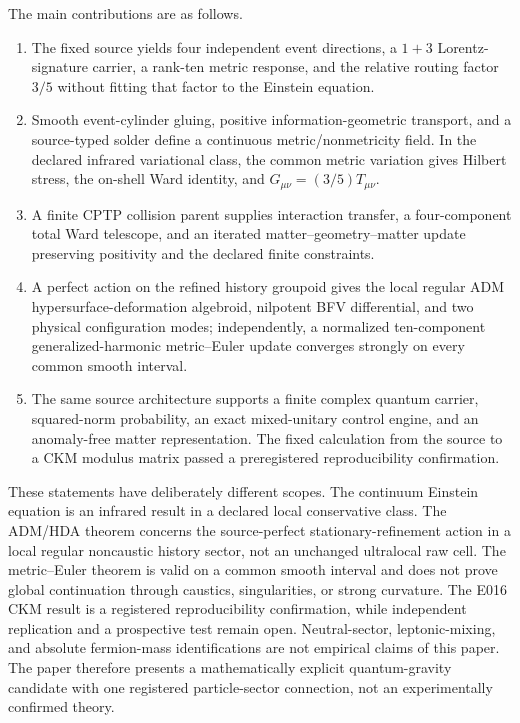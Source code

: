 \documentclass[11pt]{article}
\theoremstyle{definition}
\theoremstyle{remark}
\begin{document}
The main contributions are as follows.
\begin{enumerate}[label=(\roman*)]
  \item The fixed source yields four independent event directions, a
  $1+3$ Lorentz-signature carrier, a rank-ten metric response, and the relative
  routing factor $3/5$ without fitting that factor to the Einstein equation.
  \item Smooth event-cylinder gluing, positive information-geometric
  transport, and a source-typed solder define a continuous metric/nonmetricity
  field. In the declared infrared variational class, the common metric
  variation gives Hilbert stress, the on-shell Ward identity, and
  $G_{\mu\nu}=(3/5)T_{\mu\nu}$.
  \item A finite CPTP collision parent supplies interaction transfer, a
  four-component total Ward telescope, and an iterated matter--geometry--matter
  update preserving positivity and the declared finite constraints.
  \item A perfect action on the refined history groupoid gives the local
  regular ADM hypersurface-deformation algebroid, nilpotent BFV
  differential, and two physical configuration modes; independently, a
  normalized ten-component generalized-harmonic metric--Euler update converges
  strongly on every common smooth interval.
  \item The same source architecture supports a finite complex quantum
  carrier, squared-norm probability, an exact mixed-unitary control engine,
  and an anomaly-free matter representation. The fixed calculation from the
  source to a CKM modulus matrix passed a preregistered reproducibility
  confirmation.
\end{enumerate}

These statements have deliberately different scopes. The continuum Einstein
equation is an infrared result in a declared local conservative class. The
ADM/HDA theorem concerns the source-perfect stationary-refinement action in a
local regular noncaustic history sector, not an unchanged ultralocal raw cell.
The metric--Euler theorem is valid on a common smooth interval and does not
prove global continuation through caustics, singularities, or strong
curvature. The E016 CKM result is a registered reproducibility confirmation,
while independent replication and a prospective test remain open.
Neutral-sector, leptonic-mixing, and absolute fermion-mass identifications are
not empirical claims of this paper. The paper therefore presents a
mathematically explicit quantum-gravity candidate with one registered
particle-sector connection, not an experimentally confirmed theory.
\end{document}
